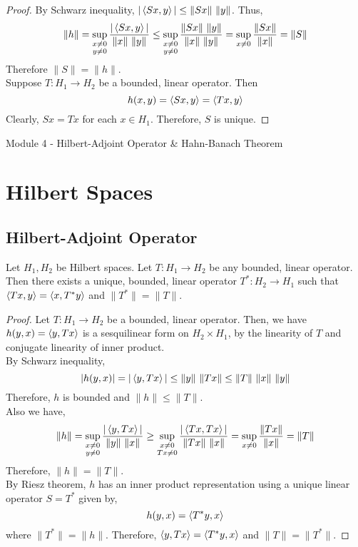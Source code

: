 \begin{proof}
	By Schwarz inequality, $|\left\langle Sx,y \right\rangle| \le \|Sx\| \ \|y\|$.
	Thus,
	\[ \|h\| = \sup_{\substack{x \ne 0 \\ y \ne 0}} \frac{|\left\langle Sx,y \right\rangle|}{\|x\| \ \|y\|} \le \sup_{\substack{x \ne 0\\ y \ne 0}} \frac{\|Sx\| \ \|y\|}{\|x\| \ \|y\|} = \sup_{x \ne 0} \frac{\|Sx\|}{\|x\|} = \|S\| \]
	Therefore $\|S\| = \|h\|$.\\

	Suppose $T : H_1 \to H_2$ be a bounded, linear operator.
	Then
	\[ h(x,y) = \left\langle Sx,y \right\rangle = \left\langle Tx,y \right\rangle \]
	Clearly, $Sx = Tx$ for each $x \in H_1$.
	Therefore, $S$ is unique.
\end{proof}

\pagebreak

{\Large Module 4 - Hilbert-Adjoint Operator \& Hahn-Banach Theorem}

\section{Hilbert Spaces}
\subsection{Hilbert-Adjoint Operator}
\begin{theorem}
	Let $H_1,H_2$ be Hilbert spaces.
	Let $T : H_1 \to H_2$ be any bounded, linear operator.
	Then there exists a unique, bounded, linear operator $T^\ast : H_2 \to H_1$ such that $\left\langle Tx,y \right\rangle = \left\langle x,T^\ast y \right\rangle$ and $\|T^\ast\| = \|T\|$.
\end{theorem}
\begin{proof}
	Let $T : H_1 \to H_2$ be a bounded, linear operator.
	Then, we have $h(y,x) = \left\langle y,Tx \right\rangle$ is a sesquilinear form on $H_2 \times H_1$, by the linearity of $T$ and conjugate linearity of inner product.\\

	By Schwarz inequality,
	\[ |h(y,x)| = |\left\langle y,Tx \right\rangle| \le \|y\| \ \|Tx\| \le \|T\| \ \|x\| \ \|y\| \]
	Therefore, $h$ is bounded and $\|h\| \le \|T\|$.\\

	Also we have,
	\[ \|h\| = \sup_{\substack{x \ne 0 \\ y \ne 0}} \frac{|\inner{y}{Tx}|}{\|y\| \ \|x\|} \ge \sup_{\substack{x \ne 0\\ Tx \ne 0}} \frac{|\inner{Tx}{Tx}|}{\|Tx\| \ \|x\|} = \sup_{x \ne 0} \frac{\|Tx\|}{\|x\|} = \|T\| \]
	Therefore, $\|h\| = \|T\|$.\\

	By Riesz theorem, $h$ has an inner product representation using a unique linear operator $S = T^\ast$ given by,
	\[ h(y,x) = \left\langle T^\ast y,x \right\rangle \]
	where $\|T^\ast\| = \|h\|$.
	Therefore, $\left\langle y,Tx \right\rangle = \left\langle T^\ast y,x \right\rangle$ and $\|T\| = \|T^\ast\|$.
\end{proof}

